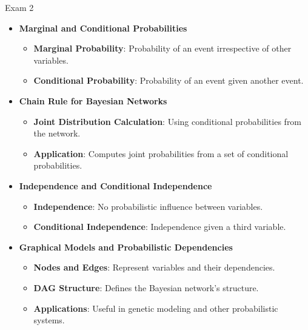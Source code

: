 \begin{examnotes}{Exam 2}
\begin{highlight}
        \begin{itemize}
            \item \textbf{Marginal and Conditional Probabilities}
                \begin{itemize}
                    \item \textbf{Marginal Probability}: Probability of an event irrespective of other variables.
                    \item \textbf{Conditional Probability}: Probability of an event given another event.
                \end{itemize}
            \item \textbf{Chain Rule for Bayesian Networks}
                \begin{itemize}
                    \item \textbf{Joint Distribution Calculation}: Using conditional probabilities from the network.
                    \item \textbf{Application}: Computes joint probabilities from a set of conditional probabilities.
                \end{itemize}
            \item \textbf{Independence and Conditional Independence}
                \begin{itemize}
                    \item \textbf{Independence}: No probabilistic influence between variables.
                    \item \textbf{Conditional Independence}: Independence given a third variable.
                \end{itemize}
            \item \textbf{Graphical Models and Probabilistic Dependencies}
                \begin{itemize}
                    \item \textbf{Nodes and Edges}: Represent variables and their dependencies.
                    \item \textbf{DAG Structure}: Defines the Bayesian network's structure.
                    \item \textbf{Applications}: Useful in genetic modeling and other probabilistic systems.
                \end{itemize}
        \end{itemize}
    \end{highlight}
\end{examnotes}